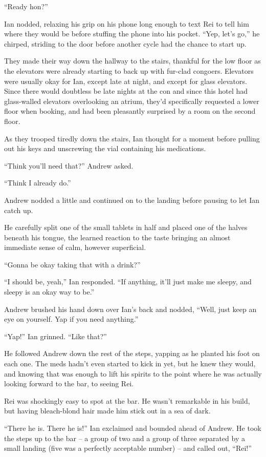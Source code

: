 ``Ready hon?''

Ian nodded, relaxing his grip on his phone long enough to text Rei to tell him where they would be before stuffing the phone into his pocket. ``Yep, let's go,'' he chirped, striding to the door before another cycle had the chance to start up.

They made their way down the hallway to the stairs, thankful for the low floor as the elevators were already starting to back up with fur-clad congoers. Elevators were usually okay for Ian, except late at night, and except for glass elevators. Since there would doubtless be late nights at the con and since this hotel had glass-walled elevators overlooking an atrium, they'd specifically requested a lower floor when booking, and had been pleasantly surprised by a room on the second floor.

As they trooped tiredly down the stairs, Ian thought for a moment before pulling out his keys and unscrewing the vial containing his medications.

``Think you'll need that?'' Andrew asked.

``Think I already do.''

Andrew nodded a little and continued on to the landing before pausing to let Ian catch up.

He carefully split one of the small tablets in half and placed one of the halves beneath his tongue, the learned reaction to the taste bringing an almost immediate sense of calm, however superficial.

``Gonna be okay taking that with a drink?''

``I should be, yeah,'' Ian responded. ``If anything, it'll just make me sleepy, and sleepy is an okay way to be.''

Andrew brushed his hand down over Ian's back and nodded, ``Well, just keep an eye on yourself. Yap if you need anything.''

``Yap!'' Ian grinned. ``Like that?''

He followed Andrew down the rest of the steps, yapping as he planted his foot on each one. The meds hadn't even started to kick in yet, but he knew they would, and knowing that was enough to lift his spirits to the point where he was actually looking forward to the bar, to seeing Rei.

Rei was shockingly easy to spot at the bar. He wasn't remarkable in his build, but having bleach-blond hair made him stick out in a sea of dark.

``There he is. There he is!'' Ian exclaimed and bounded ahead of Andrew. He took the steps up to the bar -- a group of two and a group of three separated by a small landing (five was a perfectly acceptable number) -- and called out, ``Rei!''


